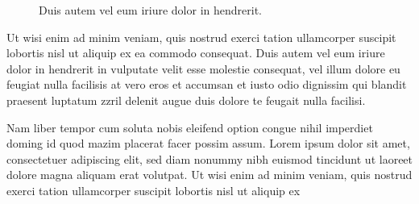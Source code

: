 \begin{figure}
    \centering
    \hfill
    \vspace{0.5cm}
    \caption{Duis autem vel eum iriure dolor in hendrerit.\label{fig:ComparisonWithGammaDetailed}}
\end{figure}

Ut wisi enim ad minim veniam, quis nostrud exerci tation ullamcorper suscipit lobortis nisl ut aliquip ex ea commodo consequat. Duis autem vel eum iriure dolor in hendrerit in vulputate velit esse molestie consequat, vel illum dolore eu feugiat nulla facilisis at vero eros et accumsan et iusto odio dignissim qui blandit praesent luptatum zzril delenit augue duis dolore te feugait nulla facilisi.   

Nam liber tempor cum soluta nobis eleifend option congue nihil imperdiet doming id quod mazim placerat facer possim assum. Lorem ipsum dolor sit amet, consectetuer adipiscing elit, sed diam nonummy nibh euismod tincidunt ut laoreet dolore magna aliquam erat volutpat. Ut wisi enim ad minim veniam, quis nostrud exerci tation ullamcorper suscipit lobortis nisl ut aliquip ex
